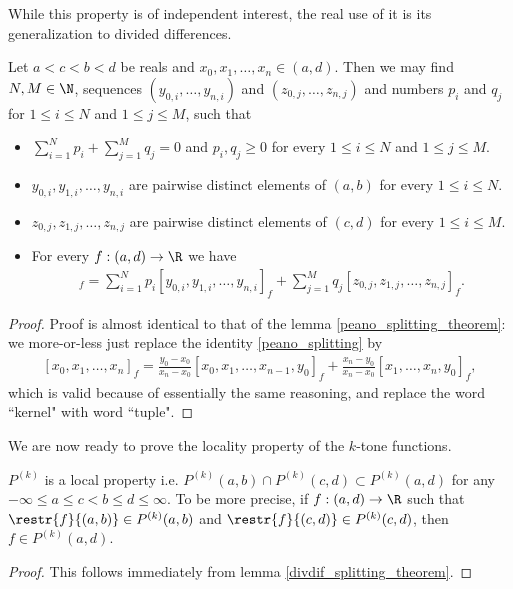 While this property is of independent interest, the real use of it is its generalization to divided differences.

\begin{lem}\label{divdif_splitting_theorem}
	Let $a < c < b < d$ be reals and $x_{0}, x_{1}, \ldots, x_{n} \in (a, d)$. Then we may find $N, M \in \N$, sequences $(y_{0, i}, \ldots, y_{n, i})$ and $(z_{0, j}, \ldots, z_{n, j})$ and numbers $p_{i}$ and $q_{j}$ for $1 \leq i \leq N$ and $1 \leq j \leq M$, such that
	\begin{itemize}
		\item $\sum_{i = 1}^{N} p_{i} + \sum_{j = 1}^{M} q_{j} = 0$ and $p_{i}, q_{j} \geq 0$ for every $1 \leq i \leq N$ and $1 \leq j \leq M$.
		\item $y_{0, i}, y_{1, i}, \ldots, y_{n, i}$ are pairwise distinct elements of $(a, b)$ for every $1 \leq i \leq N$.
		\item $z_{0, j}, z_{1, j}, \ldots, z_{n, j}$ are pairwise distinct elements of $(c, d)$ for every $1 \leq i \leq M$.
		\item For every $f : (a, d) \to \R$ we have
		\begin{align*}
			[x_{0}, x_{1}, \ldots, x_{n}]_{f} = \sum_{i = 1}^{N} p_{i} [y_{0, i}, y_{1, i}, \ldots, y_{n, i}]_{f} +  \sum_{j = 1}^{M} q_{j} [z_{0, j}, z_{1, j}, \ldots, z_{n, j}]_{f}.
		\end{align*}
	\end{itemize}
\end{lem}
\begin{proof}
	Proof is almost identical to that of the lemma \ref{peano_splitting_theorem}: we more-or-less just replace the identity \ref{peano_splitting} by
	\begin{align}\label{divdif_splitting_property}
		[x_{0}, x_{1}, \ldots, x_{n}]_{f} = \frac{y_{0} - x_{0}}{x_{n} - x_{0}} [x_{0}, x_{1}, \ldots, x_{n - 1}, y_{0}]_{f} + \frac{x_{n} - y_{0}}{x_{n} - x_{0}} [x_{1}, \ldots, x_{n}, y_{0}]_{f},
	\end{align}
	which is valid because of essentially the same reasoning, and replace the word ``kernel" with word ``tuple".
\end{proof}

We are now ready to prove the locality property of the $k$-tone functions.

\begin{prop}
	$P^{(k)}$ is a local property i.e. $P^{(k)}(a, b) \cap P^{(k)}(c, d) \subset P^{(k)}(a, d)$ for any $-\infty \leq a \leq c < b \leq d \leq \infty$. To be more precise, if $f : (a, d) \to \R$ such that $\restr{f}{(a, b)} \in P^{(k)}(a, b)$ and $\restr{f}{(c, d)} \in P^{(k)}(c, d)$, then $f \in P^{(k)}(a, d)$.
\end{prop}
\begin{proof}
	This follows immediately from lemma \ref{divdif_splitting_theorem}.
\end{proof}

